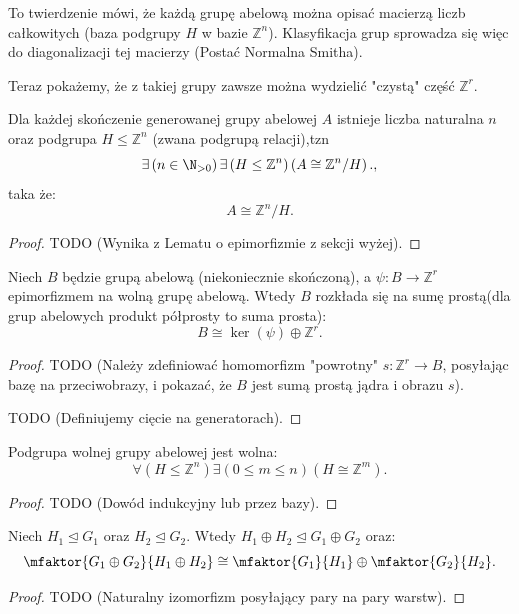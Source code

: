 \begin{intuition}
    To twierdzenie mówi, że każdą grupę abelową można opisać macierzą liczb całkowitych (baza podgrupy $H$ w bazie $\mathbb{Z}^n$). Klasyfikacja grup sprowadza się więc do diagonalizacji tej macierzy (Postać Normalna Smitha).
\end{intuition}

Teraz pokażemy, że z takiej grupy zawsze można wydzielić "czystą" część $\mathbb{Z}^r$.

\begin{theorem}
    Dla każdej skończenie generowanej grupy abelowej $A$ istnieje liczba naturalna $n$ oraz podgrupa $H \le \mathbb{Z}^n$ (zwana podgrupą relacji),tzn
     \[
     \exists\left( n\in \N_{>0} \right)\exists\left( H\le \mathbb{Z} ^{n} \right)\left( A\cong \mathbb{Z}^{n}/H \right).
     ,\] 
        taka że:
    \[ A \cong \mathbb{Z}^n / H. \]
\end{theorem}
\begin{proof}
    TODO (Wynika z Lematu o epimorfizmie z sekcji wyżej).
\end{proof}

\begin{lemma}
    Niech $B$ będzie grupą abelową (niekoniecznie skończoną), a $\psi: B \to \mathbb{Z}^r$ epimorfizmem na wolną grupę abelową.
    Wtedy $B$ rozkłada się na sumę prostą(dla grup abelowych produkt półprosty to suma prosta):
    \[ B \cong \ker(\psi) \oplus \mathbb{Z}^r. \]
\end{lemma}
\begin{proof}
    TODO (Należy zdefiniować homomorfizm "powrotny" $s: \mathbb{Z}^r \to B$, posyłając bazę na przeciwobrazy, i pokazać, że $B$ jest sumą prostą jądra i obrazu $s$).

    TODO (Definiujemy cięcie na generatorach).
\end{proof}

\begin{theorem}
    Podgrupa wolnej grupy abelowej jest wolna:
    \[
    \forall\left( H\le \mathbb{Z} ^{n} \right) \exists\left( 0\le m\le n \right)\left( H\cong\mathbb{Z}^{m} \right).
    \]
\end{theorem}
\begin{proof}
    TODO (Dowód indukcyjny lub przez bazy).
\end{proof}

\begin{theorem}
    Niech $H_1\unlhd G_1$ oraz $H_2\unlhd G_2$. Wtedy $H_1 \oplus H_2 \unlhd G_1 \oplus G_2$ oraz:
    \[
        \mfaktor{G_1 \oplus G_2}{H_1 \oplus H_2} \cong \mfaktor{G_1}{H_1} \oplus \mfaktor{G_2}{H_2}.
    \]
\end{theorem}
\begin{proof}
    TODO (Naturalny izomorfizm posyłający pary na pary warstw).
\end{proof}

